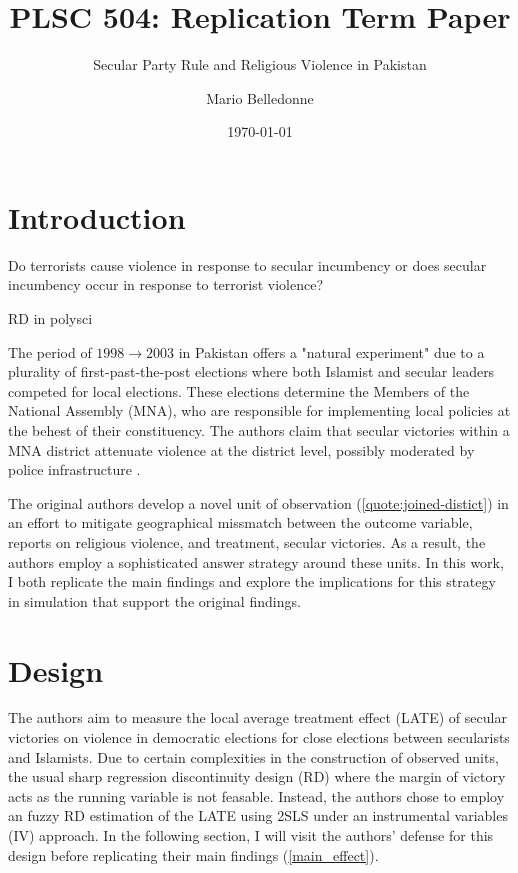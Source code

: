 \documentclass{scrartcl}
\title{PLSC 504: Replication Term Paper}
\subtitle{Secular Party Rule and Religious Violence in Pakistan}
\author{Mario Belledonne}
\date{\today}
\begin{document}
\maketitle

\section{Introduction}

Do terrorists cause violence in response to secular incumbency or does secular incumbency occur in response to terrorist violence?

RD in polysci


The period of $1998 \rightarrow 2003$ in Pakistan offers a "natural experiment" due to a plurality of first-past-the-post elections where both Islamist and secular leaders competed for local elections.
These elections determine the Members of the National Assembly (MNA), who are responsible for implementing local policies at the behest of their constituency.
The authors claim that secular victories within a MNA district attenuate violence at the district level, possibly moderated by police infrastructure \cite{nellis_siddiqui_2018}. 

The original authors develop a novel unit of observation (\ref{quote:joined-distict}) in an effort to mitigate geographical missmatch between the outcome variable, reports on religious violence, and treatment, secular victories. 
As a result, the authors employ a sophisticated answer strategy around these units.
In this work, I both replicate the main findings and explore the implications for this strategy in simulation that support the original findings.

\section{Design} \label{design}


The authors aim to measure the local average treatment effect (LATE) of secular victories on violence in democratic elections for close elections between secularists and Islamists.
Due to certain complexities in the construction of observed units, the usual sharp regression discontinuity design (RD) where the margin of victory acts as the running variable is not feasable.
Instead, the authors chose to employ an fuzzy RD estimation of the LATE using 2SLS under an instrumental variables (IV) approach.
In the following section, I will visit the authors' defense for this design before replicating their main findings (\ref{main_effect}).
\end{document}
